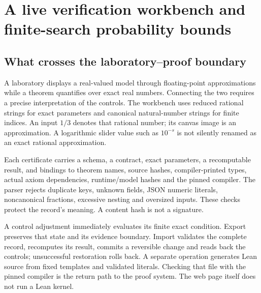 \chapter{A live verification workbench and finite-search probability bounds}
\label{chap:verification-workbench}


\section{What crosses the laboratory--proof boundary}

A laboratory displays a real-valued model through floating-point
approximations while a theorem quantifies over exact real numbers. Connecting
the two requires a precise interpretation of the controls. The workbench uses
reduced rational strings for exact parameters and canonical natural-number
strings for finite indices. An input \(1/3\) denotes that rational number;
its canvas image is an approximation. A logarithmic slider value such as
\(10^{-s}\) is not silently renamed as an exact rational approximation.

Each certificate carries a schema, a contract, exact parameters, a recomputable
result, and bindings to theorem names, source hashes, compiler-printed types,
actual axiom dependencies, runtime/model hashes and the pinned compiler. The
parser rejects duplicate keys, unknown fields, JSON numeric literals,
noncanonical fractions, excessive nesting and oversized inputs. These checks
protect the record's meaning. A content hash is not a signature.

A control adjustment immediately evaluates its finite exact condition.
Export preserves that state and its evidence boundary. Import validates the
complete record, recomputes its result, commits a reversible change and reads
back the controls; unsuccessful restoration rolls back. A separate operation
generates Lean source from fixed templates and validated literals. Checking
that file with the pinned compiler is the return path to the proof system.
The web page itself does not run a Lean kernel.

